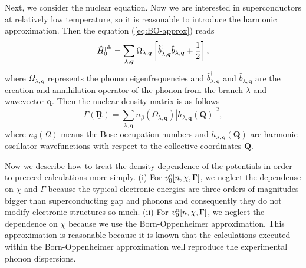 Next, we consider the nuclear equation. Now we are interested in superconductors at relatively low temperature, 
so it is reasonable to introduce the harmonic approximation. Then the equation (\ref{eq:BO-approx}) reads
%
\begin{equation}
	\hat{H}^{\rm ph}_{\rm 0} = \sum_{\lambda, \bm{q}}\Omega_{\lambda, \bm{q}}
	\left[\hat{b}^{\dag}_{\lambda, \bm{q}}\hat{b}_{\lambda, \bm{q}} + \frac{1}{2} \right],
	\label{eq:harm}
\end{equation}
%
where $\Omega_{\lambda, \bm{q}}$ represents the phonon eigenfrequencies and 
$\hat{b}^{\dag}_{\lambda, \bm{q}}$ and $\hat{b}_{\lambda, \bm{q}}$ are the creation and annihilation
operator of the phonon from the branch $\lambda$ and wavevector $\bm{q}$.
Then the nuclear density matrix is as follows
%
\begin{equation}
	\Gamma(\underline{\bm{R}}) = \sum_{\lambda, \bm{q}}n_\beta(\Omega_{\lambda, \bm{q}})
	|h_{\lambda, \bm{q}}(\bm{Q})|^2,
\end{equation}
%
where $n_\beta(\Omega)$ means the Bose occupation numbers and $h_{\lambda, \bm{q}}(\bm{Q})$ are
harmonic oscillator wavefunctions with respect to the collective coordinates $\bm{Q}$.

%
Now we describe how to treat the density dependence of the potentials in order to preceed calculations more simply.
(i) For $v^{\rm e}_0[n, \chi, \Gamma]$, we neglect the dependense on $\chi$ and $\Gamma$ because 
the typical electronic energies are three orders of magnitudes bigger than superconducting gap and phonons
and consequently they do not modify electronic structures so much.
(ii) For $v^{\rm n}_0[n, \chi, \Gamma]$, we neglect the dependence on $\chi$ because
we use the Born-Oppenheimer approximation. This approximation is reasonable because
it is known that the calculations executed within the Born-Oppenheimer approximation well reproduce
the experimental phonon dispersions\cite{Baroni2001}.

